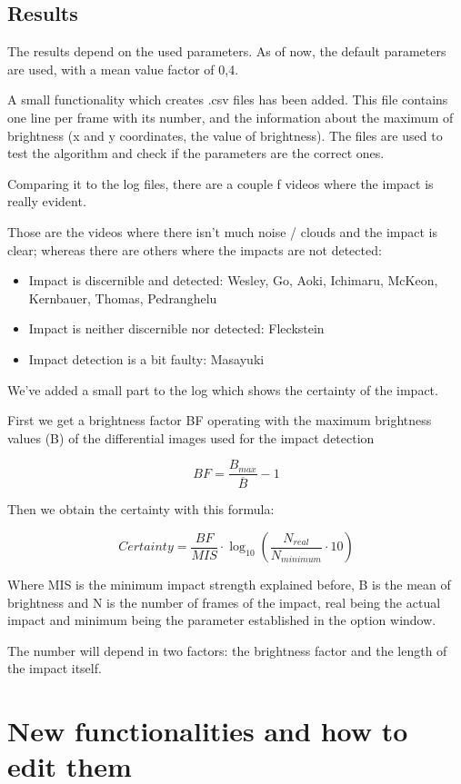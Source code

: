 \documentclass[a4paper,11pt]{memoir}
\begin{document}
\subsection{Results}
The results depend on the used parameters. As of now, the default parameters are used, with a mean value factor of 0,4.

A small functionality which creates .csv files has been added. This file contains one line per frame with its number, and the information about the maximum of brightness (x and y coordinates, the value of brightness). The files are used to test the algorithm and check if the parameters are the correct ones.

Comparing it to the log files, there are a couple f videos where the impact is really evident.

Those are the videos where there isn’t much noise / clouds and the impact is clear; whereas there are others where the impacts are not detected:
\begin{itemize}
\item Impact is discernible and detected: Wesley, Go, Aoki, Ichimaru, McKeon, Kernbauer, Thomas, Pedranghelu
\item Impact is neither discernible nor detected: Fleckstein
\item Impact detection is a bit faulty: Masayuki
\end{itemize}

We’ve added a small part to the log which shows the certainty of the impact.

First we get a brightness factor BF operating with the maximum brightness values (B) of the differential images used for the impact detection

\[ BF = \dfrac{B_{max}}{\overline{B}} - 1 \]

Then we obtain the certainty with this formula:

\[ Certainty = \dfrac{BF}{MIS} \cdot \log_{10}\left(\dfrac{N_{real}}{N_{minimum}} \cdot 10\right) \]

Where MIS is the minimum impact strength explained before, B is the mean of brightness and N is the number of frames of the impact, real being the actual impact and minimum being the parameter established in the option window.

The number will depend in two factors: the brightness factor and the length of the impact itself.

\section{New functionalities and how to edit them}
\end{document}
